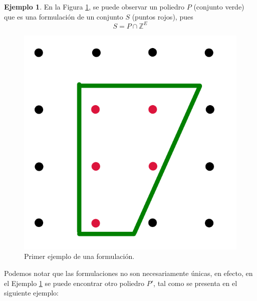 \documentclass[10pt]{article}
\newcommand{\ZZ}{\mathbb Z}
\theoremstyle{plain}
\theoremstyle{definition}
\newtheorem{eje}{Ejemplo}
\begin{document}
\begin{eje} \label{eje:formulacion1}
En la Figura \ref{fig:formulacion1}, se puede observar un poliedro $P$ (conjunto verde) que es una formulación de un conjunto $S$ (puntos rojos), pues $$S = P \cap \ZZ^{E}$$ 
\begin{figure}[H] 
    \centering
    \includegraphics[scale=0.3]{formulacion1.png}
    \caption{Primer ejemplo de una formulación.}
    \label{fig:formulacion1}
\end{figure}
\end{eje}

Podemos notar que las formulaciones no son necesariamente únicas, en efecto, en el Ejemplo \ref{eje:formulacion1} se puede encontrar otro poliedro $P'$, tal como se presenta en el siguiente ejemplo:
\end{document}
